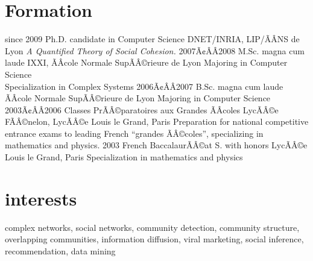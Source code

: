 \documentclass[]{friggeri-cv}
\begin{document}
\section{Formation}

\begin{entrylist}
  \entry
    {since 2009}
    {Ph.D. {\normalfont candidate in Computer Science}}
    {DNET/INRIA, LIP/ÃÂNS de Lyon}
    {\emph{A Quantified Theory of Social Cohesion.}}
  \entry
    {2007Ã¢ÂÂ2008}
    {M.Sc. magna cum laude}
    {IXXI, ÃÂcole Normale SupÃÂ©rieure de Lyon}
    {Majoring in Computer Science\\
    Specialization in Complex Systems}
  \entry
    {2006Ã¢ÂÂ2007}
    {B.Sc. magna cum laude}
    {ÃÂcole Normale SupÃÂ©rieure de Lyon}
    {Majoring in Computer Science}
  \entry
    {2003Ã¢ÂÂ2006}
    {Classes PrÃÂ©paratoires aux Grandes ÃÂcoles}
    {LycÃÂ©e FÃÂ©nelon, LycÃÂ©e Louis le Grand, Paris}
    {Preparation for national competitive entrance exams to leading French ``grandes ÃÂ©coles'', specializing in mathematics and physics.}
  \entry
    {2003}
    {French BaccalaurÃÂ©at S. with honors}
    {LycÃÂ©e Louis le Grand, Paris}
    {Specialization in mathematics and physics}
\end{entrylist}

\section{interests}

complex networks, social networks, community detection, community structure,
overlapping communities, information diffusion, viral marketing, social
inference, recommendation, data mining

% 
\end{document}
